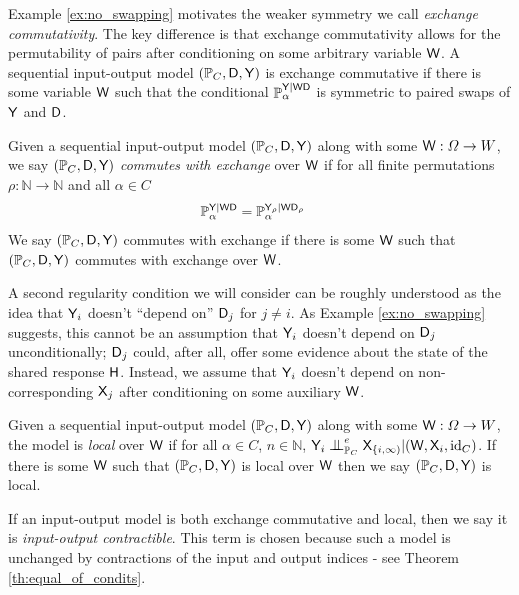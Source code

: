 Example \ref{ex:no_swapping} motivates the weaker symmetry we call \emph{exchange commutativity}. The key difference is that exchange commutativity allows for the permutability of pairs after conditioning on some arbitrary variable $\mathsf{W}$. A sequential input-output model $(\mathbb{P}_C,\mathsf{D},\mathsf{Y})$ is exchange commutative if there is some variable $\mathsf{W}$ such that the conditional $\mathbb{P}_\alpha^{\mathsf{Y}|\mathsf{WD}}$ is symmetric to paired swaps of $\mathsf{Y}$ and $\mathsf{D}$.

\begin{definition}\label{def:caus_exch}
Given a sequential input-output model $(\mathbb{P}_C,\mathsf{D},\mathsf{Y})$ along with some $\mathsf{W}:\Omega\to W$, we say $(\mathbb{P}_C,\mathsf{D},\mathsf{Y})$ \emph{commutes with exchange} over $\mathsf{W}$ if for all finite permutations $\rho:\mathbb{N}\to\mathbb{N}$ and all $\alpha\in C$
\begin{align}
    \mathbb{P}_\alpha^{\mathsf{Y}|\mathsf{WD}} &=  \mathbb{P}_\alpha^{\mathsf{Y}_\rho|\mathsf{WD}_\rho}
\end{align}
We say $(\mathbb{P}_C,\mathsf{D},\mathsf{Y})$ commutes with exchange if there is some $\mathsf{W}$ such that $(\mathbb{P}_C,\mathsf{D},\mathsf{Y})$ commutes with exchange over $\mathsf{W}$.   
\end{definition}

A second regularity condition we will consider can be roughly understood as the idea that $\mathsf{Y}_i$ doesn't ``depend on'' $\mathsf{D}_j$ for $j\neq i$. As Example \ref{ex:no_swapping} suggests, this cannot be an assumption that $\mathsf{Y}_i$ doesn't depend on $\mathsf{D}_j$ unconditionally; $\mathsf{D}_j$ could, after all, offer some evidence about the state of the shared response $\mathsf{H}$. Instead, we assume that $\mathsf{Y}_i$ doesn't depend on non-corresponding $\mathsf{X}_j$ after conditioning on some auxiliary $\mathsf{W}$.

\begin{definition}[Locality]\label{def:caus_cont}
Given a sequential input-output model $(\mathbb{P}_C,\mathsf{D},\mathsf{Y})$ along with some $\mathsf{W}:\Omega\to W$, the model is \emph{local} over $\mathsf{W}$ if for all $\alpha\in C$, $n\in \mathbb{N}$, $\RV{Y}_i\CI^e_{\prob{P}_C} \RV{X}_{\{i,\infty)}|(\RV{W},\RV{X}_i,\text{id}_C)$. If there is some $\mathsf{W}$ such that $(\mathbb{P}_C,\mathsf{D},\mathsf{Y})$ is local over $\mathsf{W}$ then we say $(\mathbb{P}_C,\mathsf{D},\mathsf{Y})$ is local.
\end{definition}

If an input-output model is both exchange commutative and local, then we say it is \emph{input-output contractible}. This term is chosen because such a model is unchanged by contractions of the input and output indices - see Theorem \ref{th:equal_of_condits}.

